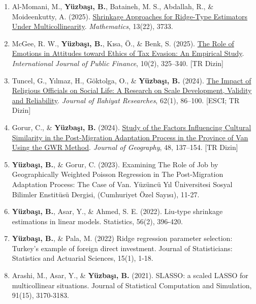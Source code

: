 \documentclass[10pt,a4paper]{article}
\newenvironment{etaremune}{\begin{enumerate}}{\end{enumerate}}
\newcommand{\JournalInfo}[2]{\hspace{0.3em}{\small\textsf{[#1; #2]}}}
\begin{document}
\begin{etaremune}
\item Al-Momani, M., {\bf Y\"{u}zba\c{s}{\i}, B.}, Bataineh, M. S., Abdallah, R., \& Moideenkutty, A. (2025). \href{https://doi.org/10.3390/math13223733}{Shrinkage Approaches for Ridge-Type Estimators Under Multicollinearity}. \textit{Mathematics}, 13(22), 3733. \JournalInfo{SCIE}{Q1}

\item McGee, R. W., {\bf Y\"{u}zba\c{s}{\i}, B.}, K{\i}sa, \"{O}., \& Benk, S. (2025). \href{https://doi.org/10.30927/ijpf.1725129}{The Role of Emotions in Attitudes toward Ethics of Tax Evasion: An Empirical Study}. \textit{International Journal of Public Finance}, 10(2), 325--340. {\small\textsf{[TR Dizin]}}

\item Tuncel, G., Y{\i}lmaz, H., G\"{o}ktolga, O., \& {\bf Y\"{u}zba\c{s}{\i}, B.} (2024). \href{https://doi.org/10.29288/ilted.1486541}{The Impact of Religious Officials on Social Life: A Research on Scale Development, Validity and Reliability}. \textit{Journal of Ilahiyat Researches}, 62(1), 86--100. {\small\textsf{[ESCI; TR Dizin]}}

\item Gorur, C., \& {\bf Y\"{u}zba\c{s}{\i}, B.} (2024). \href{https://doi.org/10.26650/JGEOG2024-1353398}{Study of the Factors Influencing Cultural Similarity in the Post-Migration Adaptation Process in the Province of Van Using the GWR Method}. \textit{Journal of Geography}, 48, 137--154. {\small\textsf{[TR Dizin]}}

\item {\bf Y\"{u}zba\c{s}{\i}, B.}, \& Gorur, C. (2023). Examining The Role of Job by Geographically Weighted Poisson Regression in The Post-Migration Adaptation Process: The Case of Van. Yüzüncü Yıl Üniversitesi Sosyal Bilimler Enstitüsü Dergisi, (Cumhuriyet Özel Sayısı), 11-27.

\item {\bf Y\"{u}zba\c{s}{\i}, B.}, Asar, Y., \& Ahmed, S. E. (2022). Liu-type shrinkage estimations in linear models. Statistics, 56(2), 396-420. \JournalInfo{SCIE}{Q2; WoS/JCR 2025}

\item {\bf Y\"{u}zba\c{s}{\i}, B.}, \& Pala, M. (2022) Ridge regression parameter selection: Turkey's example of foreign direct investment. Journal of Statisticians: Statistics and Actuarial Sciences, 15(1), 1-18.

\item Arashi, M., Asar, Y., \& {\bf Y\"{u}zba\c{s}{\i}, B.} (2021). SLASSO: a scaled LASSO for multicollinear situations. Journal of Statistical Computation and Simulation, 91(15), 3170-3183. \JournalInfo{SCIE}{Q2}



\end{etaremune}
\end{document}
